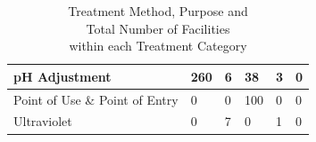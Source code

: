 \begin{center}
\begin{table}[]
\begin{tabular}{|l|l|l|l|l|l|}
pH Adjustment                              & 260                 & 6                                & 38                  & 3                 & 0                      \\ \hline
Point   of   Use   \&   Point   of   Entry & 0                   & 0                                & 100                 & 0                 & 0                      \\ \hline
Ultraviolet                                & 0                   & 7                                & 0                   & 1                 & 0                      \\ \hline
\end{tabular}
\caption{Treatment Method, Purpose and \\ Total Number of Facilities \\within each Treatment Category}
\end{table}
\end{center}


